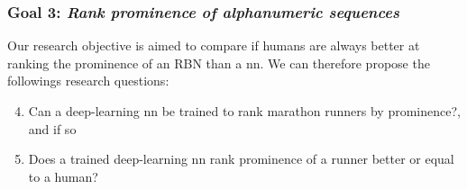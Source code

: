 \subsubsection*{Goal 3: \itshape Rank prominence of alphanumeric sequences}

Our research objective is aimed to compare if humans are always better at ranking the prominence of an RBN than a \gls{nn}.
We can therefore propose the followings research questions:
\begin{enumerate}[label=\bfseries~RQ\arabic*), leftmargin=2cm, rightmargin=1.5cm]
  \setcounter{enumi}{3}
  \item\label{rq:4} Can a deep-learning \gls{nn} be trained to rank marathon runners by prominence?, and if so
  \item\label{rq:5} Does a trained deep-learning \gls{nn} rank prominence of a runner better or equal to a human?
\end{enumerate}
